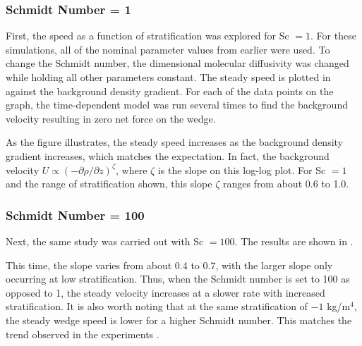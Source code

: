 \documentclass[12pt]{article}
\begin{document}
\subsubsection{Schmidt Number = 1}

First, the speed as a function of stratification was explored for Sc $=1$. For these simulations, all of the nominal parameter values from earlier were used. To change the Schmidt number, the dimensional molecular diffusivity was changed while holding all other parameters constant. The steady speed is plotted in  against the background density gradient. For each of the data points on the graph, the time-dependent model was run several times to find the background velocity resulting in zero net force on the wedge.


As the figure illustrates, the steady speed increases as the background density gradient increases, which matches the expectation. In fact, the background velocity $U\propto(-\partial\rho/\partial z)^\zeta$, where $\zeta$ is the slope on this log-log plot. For Sc $=1$ and the range of stratification shown, this slope $\zeta$ ranges from about 0.6 to 1.0.


\subsubsection{Schmidt Number = 100}

Next, the same study was carried out with Sc $=100$. The results are shown in .


This time, the slope varies from about 0.4 to 0.7, with the larger slope only occurring at low stratification. Thus, when the Schmidt number is set to 100 as opposed to 1, the steady velocity increases at a slower rate with increased stratification. It is also worth noting that at the same stratification of $-1$ kg/m$^{4}$, the steady wedge speed is lower for a higher Schmidt number. This matches the trend observed in the experiments \cite{allshouse2010propulsion}.
\end{document}
